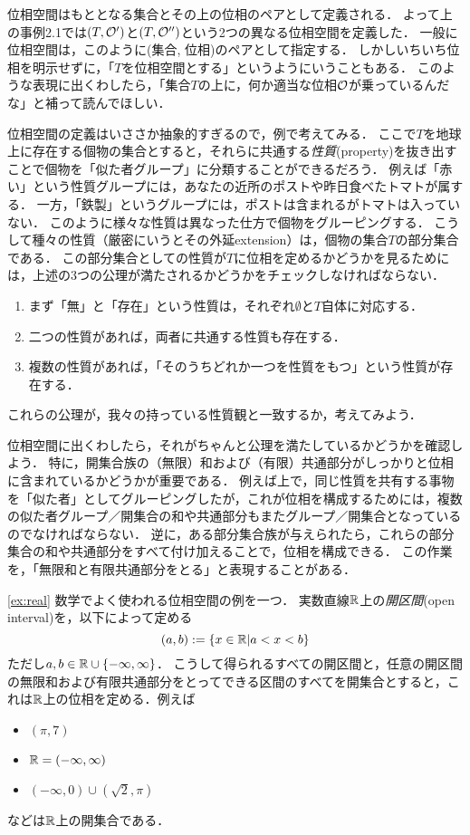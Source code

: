 \documentclass[11pt,a4paper]{jsarticle}
\begin{document}
位相空間はもととなる集合とその上の位相のペアとして定義される．
よって上の事例2.1では$(T, \mathcal{O}')$と$(T, \mathcal{O}'')$という2つの異なる位相空間を定義した．
一般に位相空間は，このように(集合, 位相)のペアとして指定する．
しかしいちいち位相を明示せずに，「$T$を位相空間とする」というようにいうこともある．
このような表現に出くわしたら，「集合$T$の上に，何か適当な位相$\mathcal{O}$が乗っているんだな」と補って読んでほしい．


\begin{example}
位相空間の定義はいささか抽象的すぎるので，例で考えてみる．
ここで$T$を地球上に存在する個物の集合とすると，それらに共通する\emph{性質}(property)を抜き出すことで個物を「似た者グループ」に分類することができるだろう．
例えば「赤い」という性質グループには，あなたの近所のポストや昨日食べたトマトが属する．
一方，「鉄製」というグループには，ポストは含まれるがトマトは入っていない．
このように様々な性質は異なった仕方で個物をグルーピングする．
こうして種々の性質（厳密にいうとその外延extension）は，個物の集合$T$の部分集合である．
この部分集合としての性質が$T$に位相を定めるかどうかを見るためには，上述の3つの公理が満たされるかどうかをチェックしなければならない．
\begin{enumerate}
 \item まず「無」と「存在」という性質は，それぞれ$\emptyset$と$T$自体に対応する．
 \item 二つの性質があれば，両者に共通する性質も存在する．
 \item 複数の性質があれば，「そのうちどれか一つを性質をもつ」という性質が存在する．
\end{enumerate}
これらの公理が，我々の持っている性質観と一致するか，考えてみよう．
\end{example}


位相空間に出くわしたら，それがちゃんと公理を満たしているかどうかを確認しよう．
特に，開集合族の（無限）和および（有限）共通部分がしっかりと位相に含まれているかどうかが重要である．
例えば上で，同じ性質を共有する事物を「似た者」としてグルーピングしたが，これが位相を構成するためには，複数の似た者グループ／開集合の和や共通部分もまたグループ／開集合となっているのでなければならない．
逆に，ある部分集合族が与えられたら，これらの部分集合の和や共通部分をすべて付け加えることで，位相を構成できる．
この作業を，「無限和と有限共通部分をとる」と表現することがある．


\begin{example}
\ref{ex:real}
数学でよく使われる位相空間の例を一つ．
実数直線$\mathbb{R}$上の\emph{開区間}(open interval)を，以下によって定める
\[
  (a, b) := \{ x \in \mathbb{R}| a < x < b \}
\]
ただし$a, b \in \mathbb{R} \cup \{-\infty, \infty\}$．
こうして得られるすべての開区間と，任意の開区間の無限和および有限共通部分をとってできる区間のすべてを開集合とすると，これは$\mathbb{R}$上の位相を定める．例えば
\begin{itemize}
 \item $(\pi,7)$
 \item $\mathbb{R} = (-\infty, \infty)$
 \item $(-\infty, 0) \cup (\sqrt{2}, \pi)$ 
\end{itemize}
などは$\mathbb{R}$上の開集合である．
\end{example}
\end{document}
